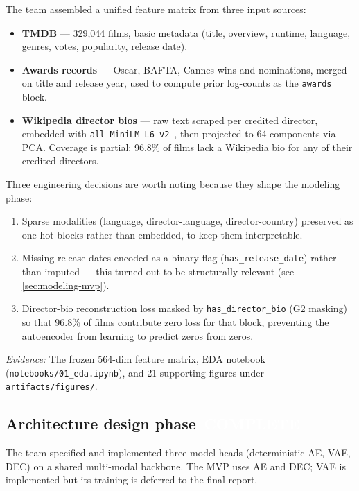 \documentclass[11pt,a4paper]{article}
\newcommand{\status}[1]{%
  \ifstrequal{#1}{complete}{\colorbox{brandAccent}{\textcolor{white}{\sffamily\bfseries\small\,COMPLETE\,}}}{%
  \ifstrequal{#1}{inprogress}{\colorbox{brandAmber}{\textcolor{white}{\sffamily\bfseries\small\,IN PROGRESS\,}}}{%
  \ifstrequal{#1}{planned}{\colorbox{brandSecondary}{\textcolor{white}{\sffamily\bfseries\small\,PLANNED\,}}}{%
  \ifstrequal{#1}{deferred}{\colorbox{brandSlate}{\textcolor{white}{\sffamily\bfseries\small\,DEFERRED\,}}}{}}}}%
}
\newcommand{\evidence}[1]{\textit{\color{brandSlate}\small Evidence: }\small #1}
\begin{document}
\noindent The team assembled a unified feature matrix from three input sources:

\begin{itemize}[leftmargin=1.2em, itemsep=2pt, topsep=2pt]
\item \textbf{TMDB} --- 329{,}044 films, basic metadata (title, overview, runtime, language, genres, votes, popularity, release date).
\item \textbf{Awards records} --- Oscar, BAFTA, Cannes wins and nominations, merged on title and release year, used to compute prior log-counts as the \texttt{awards} block.
\item \textbf{Wikipedia director bios} --- raw text scraped per credited director, embedded with \texttt{all-MiniLM-L6-v2}~\cite{reimers2019sbert}, then projected to 64 components via PCA. Coverage is partial: 96.8\% of films lack a Wikipedia bio for any of their credited directors.
\end{itemize}

\noindent Three engineering decisions are worth noting because they shape the modeling phase:
\begin{enumerate}[leftmargin=1.4em, itemsep=2pt, topsep=2pt]
\item Sparse modalities (language, director-language, director-country) preserved as one-hot blocks rather than embedded, to keep them interpretable.
\item Missing release dates encoded as a binary flag (\texttt{has\_release\_date}) rather than imputed --- this turned out to be structurally relevant (see \cref{sec:modeling-mvp}).
\item Director-bio reconstruction loss masked by \texttt{has\_director\_bio} (G2 masking) so that 96.8\% of films contribute zero loss for that block, preventing the autoencoder from learning to predict zeros from zeros.
\end{enumerate}

\noindent\evidence{The frozen 564-dim feature matrix, EDA notebook (\texttt{notebooks/01\_eda.ipynb}), and 21 supporting figures under \texttt{artifacts/figures/}.}

\clearpage

\subsection{Architecture design phase \hfill \status{complete}}
\label{sec:architecture-design}

\noindent The team specified and implemented three model heads (deterministic AE, VAE, DEC) on a shared multi-modal backbone. The MVP uses AE and DEC; VAE is implemented but its training is deferred to the final report.
\end{document}
